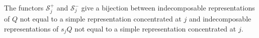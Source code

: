 The functors $\mathcal{S}_j^+$ and $\mathcal{S}_j^-$ give a bijection between
indecomposable representations of $Q$ not equal to a simple representation
concentrated at $j$ and
indecomposable representations of $s_jQ$ not equal to a simple representation
concentrated at $j$.
